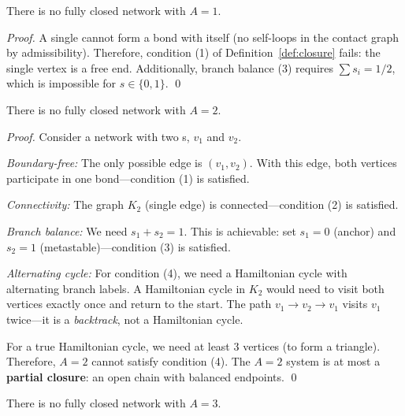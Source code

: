 \begin{lemma} \tagDer
    \label{lem:no-closed-1}
    There is no fully closed network with $A = 1$.
\end{lemma}

\begin{proof}
    A single \Junction{} cannot form a \Pinning{} bond with itself (no self-loops
    in the contact graph by admissibility). Therefore, condition (1) of
    Definition~\ref{def:closure} fails: the single vertex is a free end.
    Additionally, branch balance (3) requires $\sum s_i = 1/2$, which is
    impossible for $s \in \{0, 1\}$. \qed
\end{proof}

\begin{lemma} \tagDer
    \label{lem:no-closed-2}
    There is no fully closed network with $A = 2$.
\end{lemma}

\begin{proof}
    Consider a network with two \Junction{}s, $v_1$ and $v_2$.

    \emph{Boundary-free:} The only possible edge is $(v_1, v_2)$. With this
    edge, both vertices participate in one bond---condition (1) is satisfied.

    \emph{Connectivity:} The graph $K_2$ (single edge) is connected---condition (2)
    is satisfied.

    \emph{Branch balance:} We need $s_1 + s_2 = 1$. This is achievable:
    set $s_1 = 0$ (anchor) and $s_2 = 1$ (metastable)---condition (3) is satisfied.

    \emph{Alternating cycle:} For condition (4), we need a Hamiltonian cycle
    with alternating branch labels. A Hamiltonian cycle in $K_2$ would need to
    visit both vertices exactly once and return to the start. The path
    $v_1 \to v_2 \to v_1$ visits $v_1$ twice---it is a \emph{backtrack}, not a
    Hamiltonian cycle.

    For a true Hamiltonian cycle, we need at least 3 vertices (to form a triangle).
    Therefore, $A = 2$ cannot satisfy condition (4). The $A = 2$ system is at most
    a \textbf{partial closure}: an open chain with balanced endpoints. \qed
\end{proof}

\begin{lemma} \tagDer
    \label{lem:no-closed-3}
    There is no fully closed network with $A = 3$.
\end{lemma}

